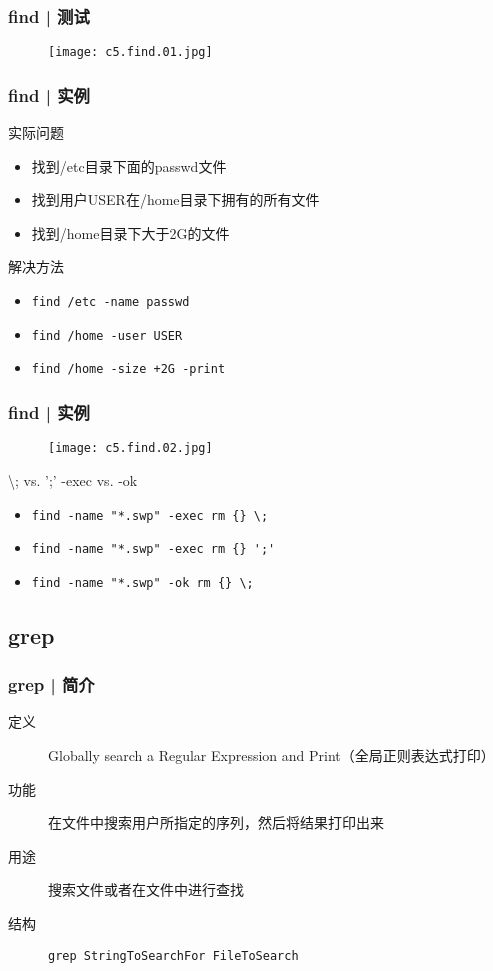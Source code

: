 \begin{frame}
  \frametitle{find | 测试}
  \begin{figure}
    \centering
    \texttt{[image: c5.find.01.jpg]}
  \end{figure}
\end{frame}

\begin{frame}[fragile]
  \frametitle{find | \alert{实例}}
  \begin{block}{实际问题}
    \begin{itemize}
      \item<2-> 找到/etc目录下面的passwd文件
      \item<4-> 找到用户USER在/home目录下拥有的所有文件
      \item<6-> 找到/home目录下大于2G的文件
    \end{itemize}
  \end{block}
  \begin{block}{解决方法}
    \begin{itemize}
      \item<3-> \verb|find /etc -name passwd|
      \item<5-> \verb|find /home -user USER|
      \item<7-> \verb|find /home -size +2G -print|
    \end{itemize}
  \end{block}
\end{frame}

\begin{frame}[fragile]
  \frametitle{find | \alert{实例}}
  \begin{figure}
    \centering
    \texttt{[image: c5.find.02.jpg]}
  \end{figure}
  \pause
  \begin{block}{\textbackslash; vs. ';' \qquad -exec vs. -ok}
  \begin{itemize}
    \item \verb|find -name "*.swp" -exec rm {} \;|
    \item \verb|find -name "*.swp" -exec rm {} ';'|
    \item \verb|find -name "*.swp" -ok rm {} \;|
  \end{itemize}
  \end{block}
\end{frame}

\subsection{grep}
\begin{frame}[fragile]
  \frametitle{grep | 简介}
  \begin{description}
    \item[定义] Globally search a Regular Expression and Print（全局正则表达式打印）
    \item[功能] 在文件中搜索用户所指定的序列，然后将结果打印出来
    \item[用途] 搜索文件或者在文件中进行查找
    \item[结构] \verb|grep StringToSearchFor FileToSearch|
  \end{description}
\end{frame}

